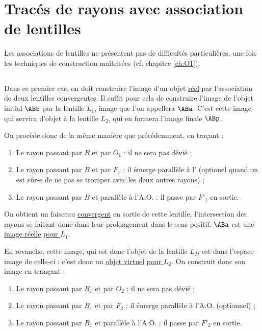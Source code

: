 \documentclass[10pt,notitlepage]{book}
\begin{document}
\section{Tracés de rayons avec association de lentilles}
Les associations de lentilles ne présentent pas de difficultés particulières,
une fois les techniques de construction maîtrisées (cf. chapitre \ref{ch:O1}).

\subsection{}
Dans ce premier cas, on doit construire l'image d'un objet \underline{réel} par
l'association de deux lentilles convergentes. Il suffit pour cela de construire
l'image de l'objet initial $\ABb$ par la lentille $L_1$, image que l'on appellera
$\ABa$. C'est cette image qui servira d'objet à la lentille $L_2$, qui en
formera l'image finale $\ABp$. \bigbreak

On procède donc de la même manière que précédemment, en traçant :
\begin{enumerate}
    \item Le rayon passant par $B$ et par $O_1$ : il ne sera pas dévié ;
    \item Le rayon passant par $B$ et par $F_1$ : il émerge parallèle à
        l' (optionel quand on est sûr-e de ne pas se
        tromper avec les deux autres rayons) ;
    \item Le rayon passant par $B$ et parallèle à l'A.O. : il passe par $F'_1$
        en sortie.
\end{enumerate}

On obtient un faisceau \underline{convergent} en sortie de cette lentille,
l'intersection des rayons se faisant donc dans leur prolongement dans le sens
positif. $\ABa$ est une \underline{image réelle} \underline{\underline{pour
$L_1$}}. \bigbreak

En revanche, cette image, qui est donc l'objet de la lentille $L_2$, est dans
l'espace image de celle-ci : c'est donc un \underline{objet virtuel}
\underline{\underline{pour $L_2$}}. On construit donc son image en trançant :

\begin{enumerate}
    \item Le rayon passant par $B_1$ et par $O_2$ : il ne sera pas dévié ;
    \item Le rayon passant par $B_1$ et par $F_2$ : il émerge parallèle à l'A.O.
        (optionnel) ;
    \item Le rayon passant par $B_1$ et parallèle à l'A.O. : il passe par $F'_2$
        en sortie.
\end{enumerate}
\end{document}
